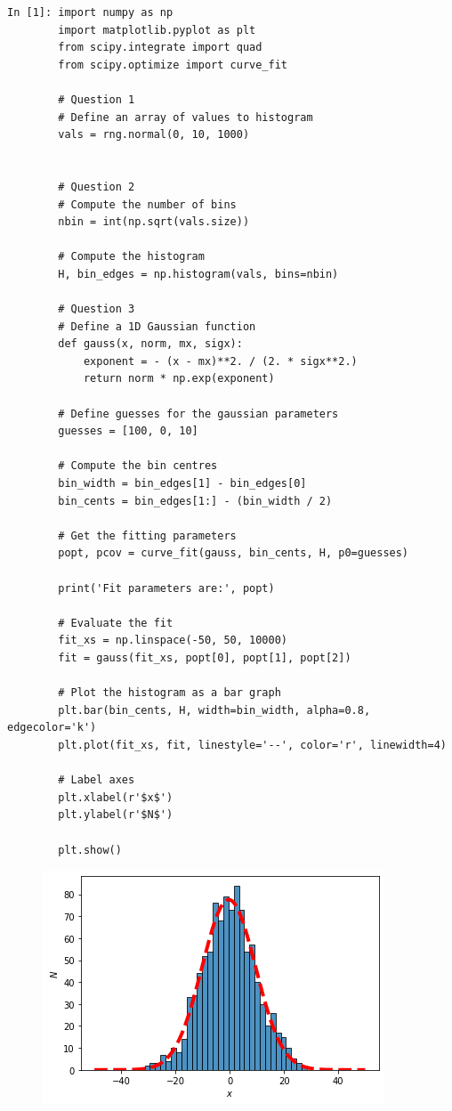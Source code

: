 \begin{lstlisting}[style=PY]
In [1]: import numpy as np
        import matplotlib.pyplot as plt
        from scipy.integrate import quad
        from scipy.optimize import curve_fit
        
        # Question 1
        # Define an array of values to histogram
        vals = rng.normal(0, 10, 1000)
        
        
        # Question 2
        # Compute the number of bins 
        nbin = int(np.sqrt(vals.size))
        
        # Compute the histogram 
        H, bin_edges = np.histogram(vals, bins=nbin)
        
        # Question 3
        # Define a 1D Gaussian function
        def gauss(x, norm, mx, sigx):
            exponent = - (x - mx)**2. / (2. * sigx**2.)
            return norm * np.exp(exponent)
        
        # Define guesses for the gaussian parameters
        guesses = [100, 0, 10]

        # Compute the bin centres
        bin_width = bin_edges[1] - bin_edges[0]
        bin_cents = bin_edges[1:] - (bin_width / 2)
        
        # Get the fitting parameters
        popt, pcov = curve_fit(gauss, bin_cents, H, p0=guesses)
        
        print('Fit parameters are:', popt)
        
        # Evaluate the fit
        fit_xs = np.linspace(-50, 50, 10000)
        fit = gauss(fit_xs, popt[0], popt[1], popt[2])
        
        # Plot the histogram as a bar graph
        plt.bar(bin_cents, H, width=bin_width, alpha=0.8, edgecolor='k')
        plt.plot(fit_xs, fit, linestyle='--', color='r', linewidth=4)
        
        # Label axes
        plt.xlabel(r'$x$')
        plt.ylabel(r'$N$')
        
        plt.show()
\end{lstlisting}

\begin{figure}[H]
	\centering
	\includegraphics[scale=0.9]{Pictures/histfit.png}
\end{figure}

